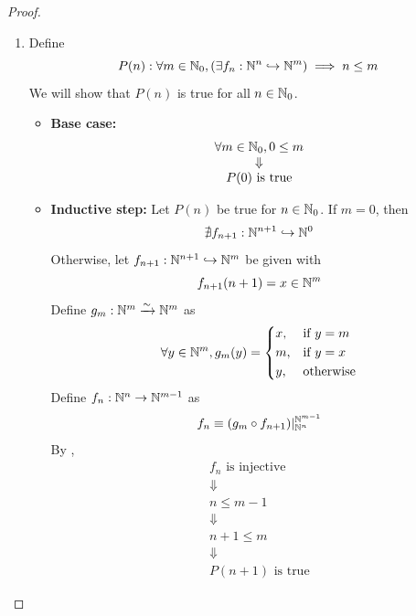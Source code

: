 \begin{proof}
    \begin{enumerate}[label=\textbf{(\Alph*)}]
        \item Define
        \[
        P(n): \forall m \in \N_{0}, \paren*{\exists f_{n}: \N^{n} \hookrightarrow \N^{m}} \implies n \leq m
        \]
        We will show that $P(n)$ is true for all $n \in \N_{0}$.
        \begin{itemize}
            \item \textbf{Base case:}
            \[
            \begin{array}{c}
                \forall m \in \N_{0}, 0 \leq m \\
                \Downarrow \\
                P(0) \text{ is true}
            \end{array}
            \]
            \item \textbf{Inductive step:} Let $P(n)$ be true for $n \in \N_{0}$. If $m = 0$, then
            \[
            \nexists f_{n + 1}: \N^{n + 1} \hookrightarrow \N^{0}
            \]
            Otherwise, let $f_{n + 1}: \N^{n + 1} \hookrightarrow \N^{m}$ be given with
            \[
            f_{n + 1}(n + 1) = x \in \N^{m}
            \]
            Define $g_{m}: \N^{m} \xrightarrow{\sim} \N^{m}$ as
            \[
            \forall y \in \N^{m}, g_{m}(y) = \begin{dcases}
                x, & \text{if } y = m \\
                m, & \text{if } y = x \\
                y, & \text{otherwise}
            \end{dcases}
            \]
            Define $f_{n}: \N^{n} \to \N^{m - 1}$ as
            \[
            f_{n} \equiv (g_{m} \circ f_{n + 1})|_{\N^{n}}^{\N^{m - 1}}
            \]
            By ,
            \[
            \begin{array}{c}
                f_{n} \text{ is injective} \\
                \Downarrow \\
                n \leq m - 1 \\
                \Downarrow \\
                n + 1 \leq m \\
                \Downarrow \\
                P(n + 1) \text{ is true}
            \end{array}
\]
\end{itemize}
\end{enumerate}
\end{proof}

